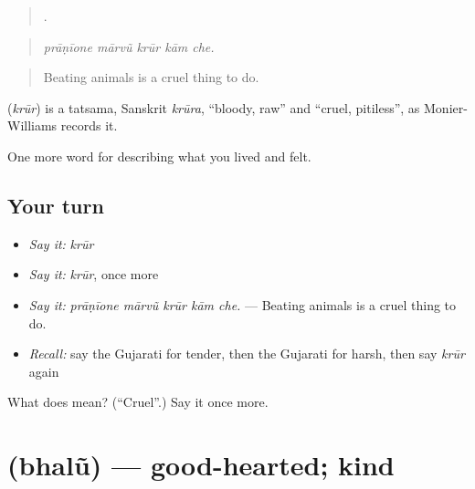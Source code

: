 \begin{quote}
    .
\end{quote}

\begin{quote}
\emph{prāṇīone mārvũ krūr kām che.}
\end{quote}

\begin{quote}
Beating animals is a cruel thing to do.
\end{quote}

\begin{cousinweb}
\textbf{} (\emph{krūr}) is a tatsama, Sanskrit \emph{krūra}, \textquotedblleft{}bloody, raw\textquotedblright{} and \textquotedblleft{}cruel, pitiless\textquotedblright{}, as Monier-Williams records it.
\end{cousinweb}

\begin{grammarlens}[title={What you've built}]
One more word for describing what you lived and felt.
\end{grammarlens}

\subsection*{Your turn}
\begin{itemize}
\raggedright
  \item \emph{Say it:} \emph{krūr}
  \item \emph{Say it:} \emph{krūr}, once more
  \item \emph{Say it:} \emph{prāṇīone mārvũ krūr kām che.} — Beating animals is a cruel thing to do.
  \item \emph{Recall:} say the Gujarati for tender, then the Gujarati for harsh, then say \emph{krūr} again
\end{itemize}

\begin{tcolorbox}[breakable,colback=teal!4,colframe=teal!35!black,title={Before you move on}]
What does  mean? (\textquotedblleft{}Cruel\textquotedblright{}.) Say it once more.
\end{tcolorbox}
\section[\texorpdfstring{\gu{ભલું} (bhalũ)}{ભલું (bhalũ)}]{ (bhalũ) — good-hearted; kind}

\label{lesson:GU-C459-bhalu}




